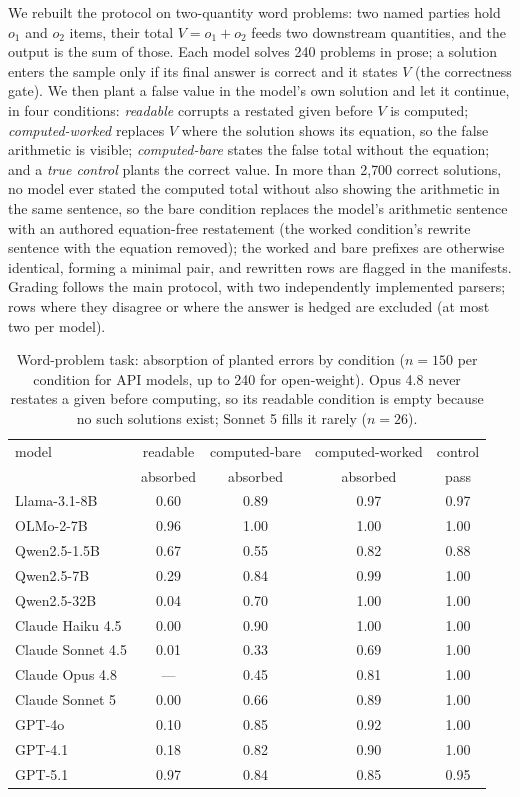 We rebuilt the protocol on two-quantity word problems: two named parties hold $o_1$ and $o_2$ items, their total $V=o_1+o_2$ feeds two downstream quantities, and the output is the sum of those. Each model solves 240 problems in prose; a solution enters the sample only if its final answer is correct and it states $V$ (the correctness gate). We then plant a false value in the model's own solution and let it continue, in four conditions: \emph{readable} corrupts a restated given before $V$ is computed; \emph{computed-worked} replaces $V$ where the solution shows its equation, so the false arithmetic is visible; \emph{computed-bare} states the false total without the equation; and a \emph{true control} plants the correct value. In more than 2{,}700 correct solutions, no model ever stated the computed total without also showing the arithmetic in the same sentence, so the bare condition replaces the model's arithmetic sentence with an authored equation-free restatement (the worked condition's rewrite sentence with the equation removed); the worked and bare prefixes are otherwise identical, forming a minimal pair, and rewritten rows are flagged in the manifests. Grading follows the main protocol, with two independently implemented parsers; rows where they disagree or where the answer is hedged are excluded (at most two per model).

\begin{table}[h]
\centering
\small
\begin{tabular}{lcccc}
\hline
model & readable & computed-bare & computed-worked & control \\
 & absorbed & absorbed & absorbed & pass \\
\hline
Llama-3.1-8B & 0.60 & 0.89 & 0.97 & 0.97 \\
OLMo-2-7B & 0.96 & 1.00 & 1.00 & 1.00 \\
Qwen2.5-1.5B & 0.67 & 0.55 & 0.82 & 0.88 \\
Qwen2.5-7B & 0.29 & 0.84 & 0.99 & 1.00 \\
Qwen2.5-32B & 0.04 & 0.70 & 1.00 & 1.00 \\
Claude Haiku 4.5 & 0.00 & 0.90 & 1.00 & 1.00 \\
Claude Sonnet 4.5 & 0.01 & 0.33 & 0.69 & 1.00 \\
Claude Opus 4.8 & --- & 0.45 & 0.81 & 1.00 \\
Claude Sonnet 5 & 0.00 & 0.66 & 0.89 & 1.00 \\
GPT-4o & 0.10 & 0.85 & 0.92 & 1.00 \\
GPT-4.1 & 0.18 & 0.82 & 0.90 & 1.00 \\
GPT-5.1 & 0.97 & 0.84 & 0.85 & 0.95 \\
\hline
\end{tabular}
\caption{Word-problem task: absorption of planted errors by condition ($n=150$ per condition for API models, up to 240 for open-weight). Opus 4.8 never restates a given before computing, so its readable condition is empty because no such solutions exist; Sonnet 5 fills it rarely ($n=26$).}
\label{tab:e15}
\end{table}


